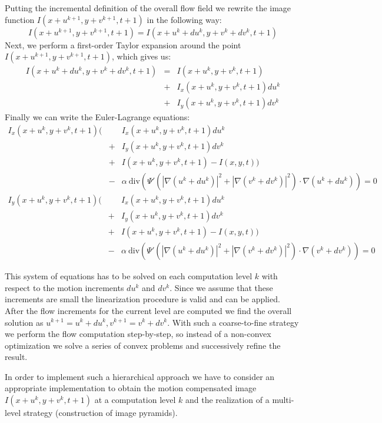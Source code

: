 Putting the incremental definition of the overall flow field we rewrite the image function $I(x+u^{k+1}, y+v^{k+1}, t+1)$ in the following way:
$$ I(x+u^{k+1}, y+v^{k+1}, t+1) = I(x+u^{k}+du^{k}, y+v^{k}+dv^{k}, t+1) $$
Next, we perform a first-order Taylor expansion around the point $I(x+u^{k+1}, y+v^{k+1}, t+1)$, which gives us:
\begin{eqnarray}
I(x+u^{k}+du^{k}, y+v^{k}+dv^{k}, t+1) &=& I(x+u^{k}, y+v^{k}, t+1) \nonumber \\ &+& I_{x}(x+u^{k}, y+v^{k}, t+1)du^{k} \nonumber \\ &+& I_{y}(x+u^{k}, y+v^{k}, t+1)dv^{k} \nonumber
\end{eqnarray}
Finally we can write the Euler-Lagrange equations:
\begin{eqnarray}
I_{x}(x+u^k, y+v^k, t+1) (& & I_{x}(x+u^{k}, y+v^{k}, t+1)du^{k} \nonumber \\ &+&  I_{y}(x+u^{k}, y+v^{k}, t+1)dv^{k} \nonumber \\ &+& I(x+u^{k}, y+v^{k}, t+1) - I(x,y,t)) \nonumber \\ &-& \alpha \: \textrm{div} (\Psi'(|\nabla (u^{k} + du^{k})|^2 + |\nabla (v^{k} + dv^{k} )|^2) \cdot \nabla (u^{k} + du^{k}) ) = 0 \nonumber
\end{eqnarray}
\begin{eqnarray}
I_{y}(x+u^k, y+v^k, t+1) (& & I_{x}(x+u^{k}, y+v^{k}, t+1)du^{k} \nonumber \\ &+&  I_{y}(x+u^{k}, y+v^{k}, t+1)dv^{k} \nonumber \\ &+& I(x+u^{k}, y+v^{k}, t+1) - I(x,y,t)) \nonumber \\ &-& \alpha \: \textrm{div} (\Psi'(|\nabla (u^{k} + du^{k})|^2 + |\nabla (v^{k} + dv^{k} )|^2) \cdot \nabla (v^{k} + dv^{k}) ) = 0 \nonumber
\end{eqnarray}

This system of equations has to be solved on each computation level $k$ with respect to the motion increments $du^{k}$ and $dv^{k}$. Since we assume that these increments are small the linearization procedure is valid and can be applied. After the flow increments for the current level are computed we find the overall solution as $u^{k+1} = u^{k} + du^{k}, v^{k+1} = v^{k} + dv^{k}$. With such a coarse-to-fine strategy we perform the flow computation step-by-step, so instead of a non-convex optimization we solve a series of convex problems and successively refine the result.
 
In order to implement such a hierarchical approach we have to consider an appropriate implementation to obtain the motion compensated image $I(x+u^k, y+v^k, t+1)$ at a computation level $k$  and the realization of a multi-level strategy (construction of image pyramids).

